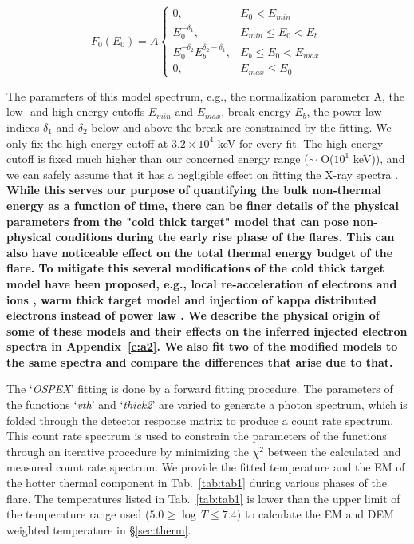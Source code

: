 \begin{equation}
    F_{0}(E_{0})=A
    \begin{cases}
        0, & E_{0}<E_{min} \\
        E_{0}^{-\delta_{1}}, & E_{min} \le E_{0} < E_{b} \\
        E_{0}^{-\delta_{2}}E_{b}^{\delta_{2}-\delta_{1}}, & E_{b} \le E_{0} < E_{max} \\
        0, & E_{max} \le E_{0}
    \end{cases}
\end{equation}

The parameters of this model spectrum, e.g., the normalization parameter A, the low- and high-energy cutoffs $E_{min}$ and $E_{max}$, break energy $E_{b}$, the power law indices $\delta_{1}$ and $\delta_{2}$ below and above the break are constrained by the fitting. We only fix the high energy cutoff at $3.2\times 10^{4}$ keV for every fit. The high energy cutoff is fixed much higher than our concerned energy range ($\sim$ O($10^{1}$ keV)), and we can safely assume that it has a negligible effect on fitting the X-ray spectra \citep{emslie12}. {\bf While this serves our purpose of quantifying the bulk non-thermal energy as a function of time, there can be finer details of the physical parameters from the "cold thick target" model that can pose non-physical conditions during the early rise phase of the flares. This can also have noticeable effect on the total thermal energy budget of the flare. To mitigate this several modifications of the cold thick target model have been proposed, e.g., local re-acceleration of electrons and ions \citep{brown09}, warm thick target model \citep{kontar15, kontar19} and injection of kappa distributed electrons instead of power law \citep{kasparova09, bataglia15, effenberger17}. We describe the physical origin of some of these models and their effects on the inferred injected electron spectra in Appendix~\ref{c:a2}. We also fit two of the modified models to the same spectra and compare the differences that arise due to that.}

The `\textit{OSPEX}' fitting is done by a forward fitting procedure. The parameters of the functions `\textit{vth}' and `\textit{thick2}' are varied to generate a photon spectrum, which is folded through the detector response matrix to produce a count rate spectrum. This count rate spectrum is used to constrain the parameters of the functions through an iterative procedure by minimizing the $\chi^{2}$ between the calculated and measured count rate spectrum. We provide the fitted temperature and the EM of the hotter thermal component in Tab.~\ref{tab:tab1} during various phases of the flare. The temperatures listed in Tab.~\ref{tab:tab1} is lower than the upper limit of the temperature range used ($5.0 \geq \log\,T \leq 7.4)$ %
to calculate the EM and DEM weighted temperature in \S\ref{sec:therm}.

